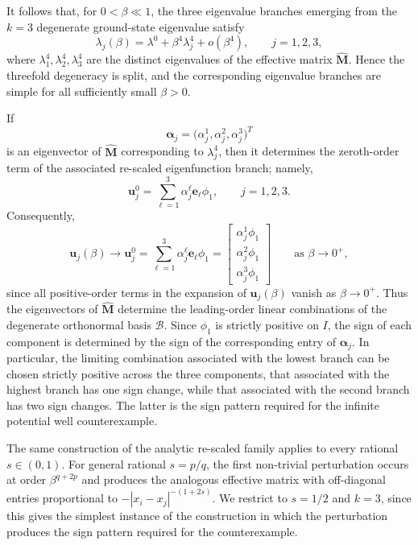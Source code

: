 \documentclass[preprint,12pt]{elsarticle}
\newcommand{\M}{\mathbf{M}}
\newcommand{\fvect}[1]{\mathbf{#1}}
\begin{document}
It follows that, for $0<\beta\ll1$, the three eigenvalue branches
emerging from the $k=3$ degenerate ground-state eigenvalue satisfy
\[
    \lambda_j(\beta)
    =
    \lambda^0+\beta^4\lambda_j^4+o(\beta^4),
    \qquad j=1,2,3,
\]
where $\lambda_1^4,\lambda_2^4,\lambda_3^4$ are the distinct
eigenvalues of the effective matrix $\widehat{\M}$. Hence the
threefold degeneracy is split, and the corresponding eigenvalue
branches are simple for all sufficiently small $\beta>0$.

If
\[
    \boldsymbol{\alpha}_j
    =
    \bigl(
        \alpha_j^1,
        \alpha_j^2,
        \alpha_j^3
    \bigr)^T
\]
is an eigenvector of $\widehat{\M}$ corresponding to
$\lambda_j^4$, then it determines the zeroth-order term of the
associated re-scaled eigenfunction branch; namely,
\[
    \fvect{u}_j^0
    =
    \sum_{\ell=1}^3
    \alpha_j^\ell\fvect{e}_\ell\phi_1,
    \qquad j=1,2,3.
\]
Consequently,
\[
    \fvect{u}_j(\beta)
    \longrightarrow
    \fvect{u}_j^0
    =
    \sum_{\ell=1}^3
    \alpha_j^\ell\fvect{e}_\ell\phi_1
    =
    \begin{bmatrix}
        \alpha_j^1\phi_1\\
        \alpha_j^2\phi_1\\
        \alpha_j^3\phi_1
    \end{bmatrix}
    \qquad
    \text{as }\beta\to0^+,
\]
since all positive-order terms in the expansion of
$\fvect{u}_j(\beta)$ vanish as $\beta\to0^+$. Thus the eigenvectors of
$\widehat{\M}$ determine the leading-order linear combinations of the
degenerate orthonormal basis $\mathcal B$. Since $\phi_1$ is strictly positive on $I$, the sign of each component is determined by the sign of the corresponding entry of $\boldsymbol{\alpha}_j$. In particular, the limiting combination associated with the lowest branch can be chosen strictly positive across the three components, that associated with the highest branch has one sign change, while that associated with the second branch has two sign changes. The latter is the sign pattern required for the infinite potential well counterexample.

The same construction of the analytic re-scaled family applies to every rational $s\in(0,1)$. For general rational $s=p/q$, the first non-trivial perturbation occurs at order $\beta^{q+2p}$ and produces the analogous effective matrix with off-diagonal entries proportional to $-|x_i-x_j|^{-(1+2s)}$. We restrict to $s=1/2$ and $k=3$, since this gives the simplest instance of the construction in which the perturbation produces the sign pattern required for the counterexample.
\end{document}
